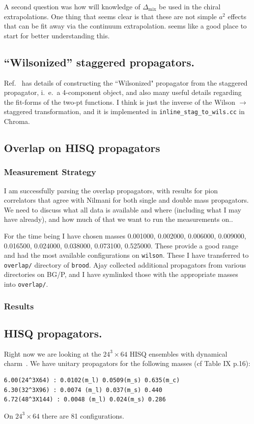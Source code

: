 \documentclass[11pt,a4paper]{article}
\newcommand{\Dmix}[0]{\Delta_{\text{mix}}}
\begin{document}
A second question was how will knowledge of $\Dmix$ be used in the chiral extrapolations.
One thing that seems clear is that these are not simple $a^2$ effects that can be fit away via the continuum extrapolation.  
\cite{WalkerLoud:2008bp} seems like a good place to start for better understanding this.

\subsection{``Wilsonized'' staggered propagators.}
Ref.~\cite{Orginos:2007tw} has details of constructing the ``Wilsonized" propagator
from the staggered propagator, i.\ e.\ a 4-component object,
and also many useful details regarding the fit-forms of the two-pt functions.  I think is just the inverse
of the Wilson $\rightarrow$ staggered transformation, and it is implemented in {\tt inline\_stag\_to\_wils.cc} in Chroma.


\subsection{Overlap on HISQ propagators}
\subsubsection{Measurement Strategy}
I am successfully parsing the overlap propagators, with results for pion correlators that agree
with Nilmani for both single and double mass propagators.  We need to discuss what all data is available and where (including what I may have already), and how much of that we want to run the measurements on..

For the time being I have chosen masses 
0.001000, 0.002000, 0.006000, 0.009000, 0.016500, 0.024000, 0.038000, 0.073100, 0.525000.
These provide a good range and had the most available configurations on {\tt wilson}.
These I have transferred to {\tt overlap/} directory of {\tt brood}.
Ajay collected additional propagators from various directories on BG/P, and I have symlinked
those with the appropriate masses into {\tt overlap/}.

\subsubsection{Results}


\subsection{HISQ propagators.}
Right now we are looking at the $24^3 \times 64$ HISQ ensembles with dynamical charm~\cite{Bazavov:2012xda}.
We have unitary propagators for the following masses (cf  Table IX p.16):
\begin{verbatim}
6.00(24^3X64) : 0.0102(m_l) 0.0509(m_s) 0.635(m_c)
6.30(32^3X96) : 0.0074 (m_l) 0.037(m_s) 0.440
6.72(48^3X144) : 0.0048 (m_l) 0.024(m_s) 0.286
\end{verbatim}
On $24^3 \times 64$ there are 81 configurations.
\end{document}
